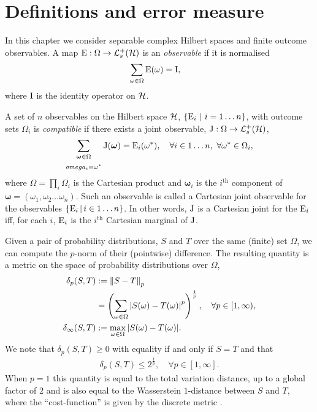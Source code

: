 \section{Definitions and error measure}
\label{sec:error-measure}
In this chapter we consider separable complex Hilbert spaces and finite outcome observables. A map $\ope:\Omega\to \posops[\hcal]$ is an \emph{observable} if it is normalised
\begin{align}
  \sum_{\omega\in\Omega} \operatorname{E}(\omega) &= \operatorname{I},
\end{align}
where $\operatorname{I}$ is the identity operator on $\mathcal{H}$.

A set of $n$ observables on the Hilbert space $\mathcal{H}$, $\left\{\operatorname{E}_i\,\,\middle|\,\,i=1\hdots n\right\}$, with outcome sets $\Omega_i$ is \emph{compatible} if there exists a joint observable, $\opj: \Omega \to \posops[\hcal]$,
\begin{align}
  \label{eqn:cart-joint}
  \sum_{\substack{\bm{\omega}\in\Omega\\ \\omega_i = \omega^*}}\operatorname{J}(\bm{\omega}) = \operatorname{E}_i(\omega^*), \quad \forall i\in 1\hdots n,\ \forall \omega^*\in\Omega_i,
\end{align}
where $\Omega = \prod_i \Omega_i$ is the Cartesian product and $\bm{\omega}_i$ is the $i^\text{th}$ component of $\bm{\omega} = (\omega_1,\omega_2\hdots\omega_n)$. Such an observable is called a Cartesian joint observable for the observables $\left\{\operatorname{E}_i\,\middle|\,i\in 1\hdots n\right\}$. In other words, $\operatorname{J}$ is a Cartesian joint for the $\operatorname{E}_i$ iff, for each $i$, $\operatorname{E}_i$ is the $i^\text{th}$ Cartesian marginal of $\operatorname{J}$.

Given a pair of probability distributions, $S$ and $T$  over the same (finite) set $\Omega$, we can compute the $p$-norm of their (pointwise) difference. The resulting quantity is a metric on the space of probability distributions over $\Omega$,
\begin{align}
  \delta_p(S,T) &\defeq \pnorm{S - T}\\
                 &= \left(\sum_{\omega\in\Omega}\abs{S(\omega) - T(\omega)}^p\right)^{\frac{1}{p}}, \quad \forall p\in[1,\infty),\\
  \delta_\infty(S,T) &\defeq \max_{\omega\in\Omega}\abs{S(\omega) - T(\omega)}.
\end{align}
We note that $\delta_p(S,T) \geq 0$ with equality if and only if $S = T$ and that
\begin{align}
  \delta_p(S,T) \leq 2^{\frac{1}{p}}, \quad \forall p\in [1,\infty].
\end{align}
When $p=1$ this quantity is equal to the total variation distance, up to a global factor of $2$ and is also equal to the Wasserstein $1$-distance between $S$ and $T$, where the ``cost-function'' is given by the discrete metric \cites{markov-mixing-levin-peres-wilmer}{optimal-transport-villani}.


